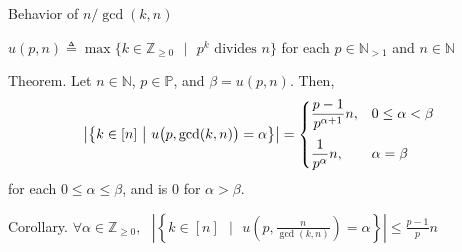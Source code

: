 \documentclass{beamer}
\newcommand{\mbb}[1]{\mathbb{#1}}
\newcommand{\mrm}[1]{\mathrm{#1}}
\renewcommand{\:}{\text{ }}
\newcommand{\ord}[1]{\mrm{ord}_{#1}}
\begin{document}

    \begin{frame}{Behavior of $n/\gcd(k, n)$}
        \centerline{$u(p, n) \triangleq \max \big\{ k \in \mbb{Z}_{\geq 0} \:\big|\: p^k\text{ divides }n \big\}$ for each $p\in \mbb{N}_{>1}$ and $n \in \mbb{N}$}
        \begin{exampleblock}{Theorem.}
            Let $n \in \mbb{N}$, $p \in \mbb{P}$, and $\beta = u(p, n)$. Then,
            \[ \left| \left\{ k \in [n] \:\big|\: u\big( p, \gcd(k, n) \big) = \alpha \right\} \right| = \begin{cases}
                \displaystyle \frac{p-1}{p^{\alpha+1}}n \vspace*{.7em}, & 0 \leq \alpha < \beta \\
                \displaystyle \frac{1}{p^\alpha}n, & \alpha = \beta
            \end{cases} \]
            for each $0 \leq \alpha \leq \beta$, and is $0$ for $\alpha > \beta$.
        \end{exampleblock}
        \begin{exampleblock}{Corollary.}
            \centering
            $\displaystyle \forall \alpha \in \mbb{Z}_{\geq 0},\: \left| \left\{ k \in [n] \:\bigg|\: u\left( p, \frac{n}{\gcd(k, n)} \right) = \alpha \right\} \right| \leq \frac{p-1}{p}n$
        \end{exampleblock}
    \end{frame}
\end{document}
